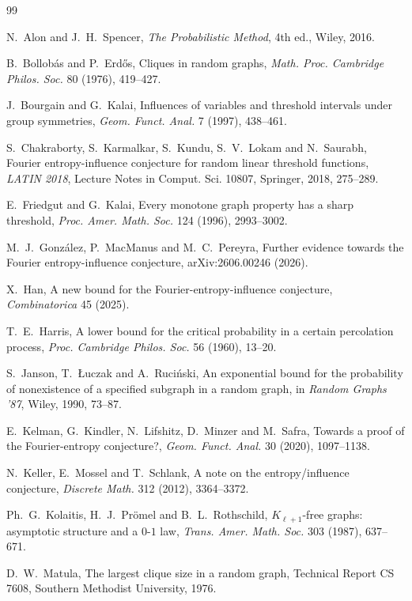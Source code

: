 \documentclass[11pt]{amsart}
\theoremstyle{remark}
\begin{document}
\begin{thebibliography}{99}

 N.~Alon and J.~H.~Spencer, \emph{The Probabilistic Method}, 4th ed., Wiley, 2016.

 B.~Bollob\'as and P.~Erd\H os, Cliques in random graphs, \emph{Math. Proc. Cambridge Philos. Soc.} 80
(1976), 419--427.

 J.~Bourgain and G.~Kalai, Influences of variables and threshold intervals under group symmetries,
\emph{Geom. Funct. Anal.} 7 (1997), 438--461.

 S.~Chakraborty, S.~Karmalkar, S.~Kundu, S.~V.~Lokam and N.~Saurabh, Fourier entropy-influence
conjecture for random linear threshold functions, \emph{LATIN 2018}, Lecture Notes in Comput. Sci. 10807,
Springer, 2018, 275--289.

 E.~Friedgut and G.~Kalai, Every monotone graph property has a sharp threshold, \emph{Proc. Amer.
Math. Soc.} 124 (1996), 2993--3002.

 M.~J.~Gonz\'alez, P.~MacManus and M.~C.~Pereyra, Further evidence towards the Fourier
entropy-influence conjecture, arXiv:2606.00246 (2026).

 X.~Han, A new bound for the Fourier-entropy-influence conjecture, \emph{Combinatorica} 45 (2025).

 T.~E.~Harris, A lower bound for the critical probability in a certain percolation process,
\emph{Proc. Cambridge Philos. Soc.} 56 (1960), 13--20.

 S.~Janson, T.~\L uczak and A.~Ruci\'nski, An exponential bound for the probability of nonexistence of
a specified subgraph in a random graph, in \emph{Random Graphs '87}, Wiley, 1990, 73--87.

 E.~Kelman, G.~Kindler, N.~Lifshitz, D.~Minzer and M.~Safra, Towards a proof of the
Fourier-entropy conjecture?, \emph{Geom. Funct. Anal.} 30 (2020), 1097--1138.

 N.~Keller, E.~Mossel and T.~Schlank, A note on the entropy/influence conjecture, \emph{Discrete
Math.} 312 (2012), 3364--3372.

 Ph.~G.~Kolaitis, H.~J.~Pr\"omel and B.~L.~Rothschild, $K_{\ell+1}$-free graphs: asymptotic structure
and a $0$-$1$ law, \emph{Trans. Amer. Math. Soc.} 303 (1987), 637--671.

 D.~W.~Matula, The largest clique size in a random graph, Technical Report CS 7608, Southern Methodist
University, 1976.


\end{thebibliography}
\end{document}
